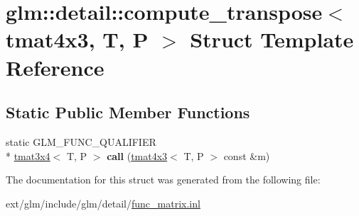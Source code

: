 \hypertarget{structglm_1_1detail_1_1compute__transpose_3_01tmat4x3_00_01_t_00_01_p_01_4}{\section{glm\-:\-:detail\-:\-:compute\-\_\-transpose$<$ tmat4x3, T, P $>$ Struct Template Reference}
\label{structglm_1_1detail_1_1compute__transpose_3_01tmat4x3_00_01_t_00_01_p_01_4}
}
\subsection*{Static Public Member Functions}
\begin{DoxyCompactItemize}
\item 
\hypertarget{structglm_1_1detail_1_1compute__transpose_3_01tmat4x3_00_01_t_00_01_p_01_4_a07d20015b9385bb4961cbb4b6e9f57ad}{static G\-L\-M\-\_\-\-F\-U\-N\-C\-\_\-\-Q\-U\-A\-L\-I\-F\-I\-E\-R \\*
\hyperlink{structglm_1_1tmat3x4}{tmat3x4}$<$ T, P $>$ {\bfseries call} (\hyperlink{structglm_1_1tmat4x3}{tmat4x3}$<$ T, P $>$ const \&m)}\label{structglm_1_1detail_1_1compute__transpose_3_01tmat4x3_00_01_t_00_01_p_01_4_a07d20015b9385bb4961cbb4b6e9f57ad}

\end{DoxyCompactItemize}


The documentation for this struct was generated from the following file\-:\begin{DoxyCompactItemize}
\item 
ext/glm/include/glm/detail/\hyperlink{func__matrix_8inl}{func\-\_\-matrix.\-inl}\end{DoxyCompactItemize}
